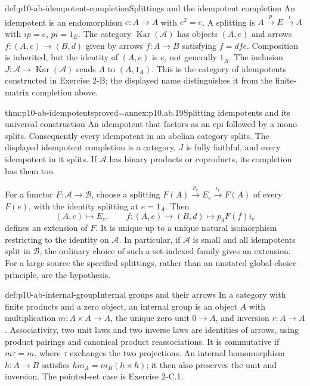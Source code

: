 \begin{hbdefinition}{def:p10-ab-idempotent-completion}{Splittings and the idempotent completion}
An idempotent is an endomorphism \(e:A\to A\) with \(e^2=e\).
A splitting is \(A\xrightarrow p E\xrightarrow i A\) with
\(ip=e\), \(pi=1_E\). The category
\(\operatorname{Kar}(\mathcal A)\) has objects \((A,e)\) and
arrows \(f:(A,e)\to(B,d)\) given by arrows \(f:A\to B\)
satisfying \(f=dfe\). Composition is inherited, but the identity
of \((A,e)\) is \(e\), not generally \(1_A\).
The inclusion \(J:\mathcal A\to\operatorname{Kar}(\mathcal A)\)
sends \(A\) to \((A,1_A)\). This is the category of idempotents
constructed in Exercise 2-B; the displayed name distinguishes it from
the finite-matrix completion above.
\end{hbdefinition}

\begin{hbtheorem}{thm:p10-ab-idempotents}{proved=annex:p10.ab.19}{Splitting idempotents and its universal construction}
An idempotent that factors as an epi followed by a mono splits.
Consequently every idempotent in an abelian category splits.
The displayed idempotent completion is a category, \(J\) is fully
faithful, and every idempotent in it splits. If \(\mathcal A\) has
binary products or coproducts, its completion has them too.

For a functor \(F:\mathcal A\to\mathcal B\), choose a splitting
\(F(A)\xrightarrow{p_e}E_e\xrightarrow{i_e}F(A)\) of every
\(F(e)\), with the identity splitting at \(e=1_A\). Then
\[
 (A,e)\longmapsto E_e,\qquad
 f:(A,e)\to(B,d)\longmapsto p_dF(f)i_e
\]
defines an extension of \(F\). It is unique up to a unique natural
isomorphism restricting to the identity on \(\mathcal A\).
In particular, if \(\mathcal A\) is small and all idempotents split
in \(\mathcal B\), the ordinary choice of such a set-indexed family
gives an extension. For a large source the specified splittings, rather
than an unstated global-choice principle, are the hypothesis.
\end{hbtheorem}

\begin{hbdefinition}{def:p10-ab-internal-group}{Internal groups and their arrows}
In a category with finite products and a zero object, an internal group
is an object \(A\) with multiplication \(m:A\times A\to A\),
the unique zero unit \(0\to A\), and inversion \(r:A\to A\).
Associativity, two unit laws and two inverse laws are identities of
arrows, using product pairings and canonical product reassociations.
It is commutative if \(m\tau=m\), where \(\tau\) exchanges the
two projections. An internal homomorphism \(h:A\to B\) satisfies
\(hm_A=m_B(h\times h)\); it then also preserves the unit and
inversion. The pointed-set case is Exercise 2-C.1.
\end{hbdefinition}

